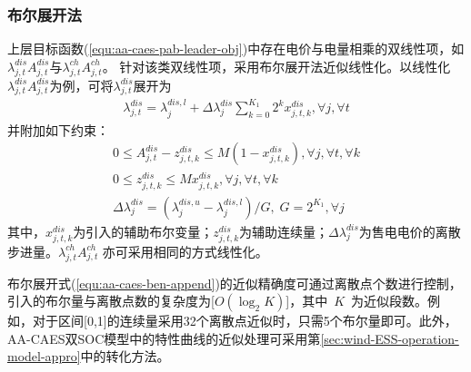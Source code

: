 \subsubsection{布尔展开法}
上层目标函数(\ref{equ:aa-caes-pab-leader-obj})中存在电价与电量相乘的双线性项，如$\lambda _{j,t}^{dis}A_{j,t}^{dis}$与$\lambda _{j,t}^{ch}A_{j,t}^{ch}$。 针对该类双线性项，采用布尔展开法\cite{Binary-Expansion-1,Binary-Expansion-2}近似线性化。以线性化$\lambda _{j,t}^{dis}A_{j,t}^{dis}$为例，可将$\lambda _{j,t}^{dis}$展开为
\begin{eqnarray}
\label{equ:aa-caes-ben-1}
\lambda _{j,t}^{dis} = \lambda _j^{dis,l} + \Delta \lambda _j^{dis}\sum\limits_{k = 0}^{{K_1}} {{2^k}} x_{j,t,k}^{dis},\forall j,\forall t
\end{eqnarray}
并附加如下约束：
\begin{subequations}
\label{equ:aa-caes-ben-append}
\begin{gather}
0 \le A_{j,t}^{dis} - z_{j,t,k}^{dis} \le M({1 - x_{j,t,k}^{dis}}),\forall j,\forall t,\forall k\\
0 \le z_{j,t,k}^{dis} \le Mx_{j,t,k}^{dis},\forall j,\forall t,\forall k\\
\Delta \lambda _j^{dis} = ({\lambda _j^{dis,u} - \lambda _j^{dis,l}})/G,\;G = {2^{{K_1}}},\forall j
\end{gather}
\end{subequations}
其中，$x_{j,t,k}^{dis}$为引入的辅助布尔变量；$z_{j,t,k}^{dis}$为辅助连续量；$\Delta \lambda _j^{dis}$为售电电价的离散步进量。$\lambda _{j,t}^{ch}A_{j,t}^{ch}$ 亦可采用相同的方式线性化。

布尔展开式(\ref{equ:aa-caes-ben-append})的近似精确度可通过离散点个数进行控制，引入的布尔量与离散点数的复杂度为[$O(\log_2{K})$]，其中~$K$~为近似段数。例如，对于区间[0,1]的连续量采用32个离散点近似时，只需5个布尔量即可。此外，AA-CAES双SOC模型中的特性曲线的近似处理可采用第\ref{sec:wind-ESS-operation-model-appro}中的转化方法。

